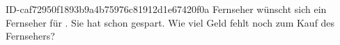 \begin{exercise}
      {ID-caf72950f1893b9a4b75976c81912d1e67420f0a}
      {Fernseher}
  \ifproblem\problem
    \xxa{} wünscht sich ein Fernseher für . Sie hat schon  gespart.
    Wie viel Geld fehlt noch zum Kauf des Fernsehers?
  \fi
\end{exercise}
